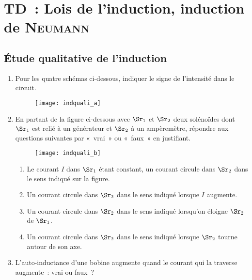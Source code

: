 \documentclass[a4paper, 10pt, final, garamond]{book}
\begin{document}
\setcounter{chapter}{2}

\chapter{TD~: Lois de l'induction, induction de \textsc{Neumann}}
\section{Étude qualitative de l'induction}
\label{sec:indquali}
\begin{enumerate}
  \item Pour les quatre schémas ci-dessous, indiquer le signe de l'intensité
    dans le circuit.
    \begin{figure}[h]
      \centering
      \texttt{[image: indquali\_a]}
      \label{fig:indquali_a}
    \end{figure}
  \item En partant de la figure ci-dessous avec $\Sr_1$ et $\Sr_2$ deux
    solénoïdes dont $\Sr_1$ est relié à un générateur et $\Sr_2$ à un
    ampèremètre, répondre aux questions suivantes par «~vrai~» ou «~faux~» en
    justifiant.
    \begin{figure}[h]
      \centering
      \texttt{[image: indquali\_b]}
      \label{fig:indquali_b}
    \end{figure}
    \begin{enumerate}
      \item Le courant $I$ dans $\Sr_1$ étant constant, un courant circule dans
        $\Sr_2$ dans le sens indiqué sur la figure.
      \item Un courant circule dans $\Sr_2$ dans le sens indiqué lorsque $I$
        augmente.
      \item Un courant circule dans $\Sr_2$ dans le sens indiqué lorsqu'on
        éloigne $\Sr_2$ de $\Sr_1$.
      \item Un courant circule dans $\Sr_2$ dans le sens indiqué lorsque $\Sr_2$
        tourne autour de son axe.
    \end{enumerate}
  \item L'auto-inductance d'une bobine augmente quand le courant qui la traverse
    augmente~: vrai ou faux~?
\end{enumerate}
\end{document}

